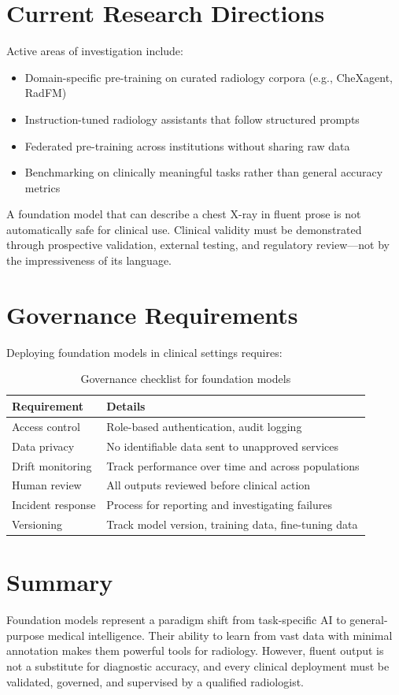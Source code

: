 \section{Current Research Directions}
Active areas of investigation include:
\begin{itemize}
    \item Domain-specific pre-training on curated radiology corpora (e.g., CheXagent, RadFM)
    \item Instruction-tuned radiology assistants that follow structured prompts
    \item Federated pre-training across institutions without sharing raw data
    \item Benchmarking on clinically meaningful tasks rather than general accuracy metrics
\end{itemize}

\begin{pearlbox}
A foundation model that can describe a chest X-ray in fluent prose is not automatically safe for clinical use. Clinical validity must be demonstrated through prospective validation, external testing, and regulatory review---not by the impressiveness of its language.
\end{pearlbox}

\section{Governance Requirements}
Deploying foundation models in clinical settings requires:
\begin{table}[h]
\centering
\caption{Governance checklist for foundation models}
\begin{tabular}{|p{}|p{}|}
\hline
\textbf{Requirement} & \textbf{Details} \\
\hline
Access control & Role-based authentication, audit logging \\
\hline
Data privacy & No identifiable data sent to unapproved services \\
\hline
Drift monitoring & Track performance over time and across populations \\
\hline
Human review & All outputs reviewed before clinical action \\
\hline
Incident response & Process for reporting and investigating failures \\
\hline
Versioning & Track model version, training data, fine-tuning data \\
\hline
\end{tabular}
\end{table}

\section{Summary}
Foundation models represent a paradigm shift from task-specific AI to general-purpose medical intelligence. Their ability to learn from vast data with minimal annotation makes them powerful tools for radiology. However, fluent output is not a substitute for diagnostic accuracy, and every clinical deployment must be validated, governed, and supervised by a qualified radiologist.

\clearpage
